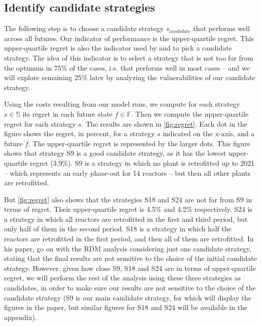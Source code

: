 \subsection{Identify candidate strategies}

The following step is to choose a candidate strategy $s_{candidate}$ that performs well across all futures. Our indicator of performance is the upper-quartile regret. This upper-quartile regret is also the indicator used by \citet{Lempert2006} and \citet{Nahmmacher2016} to pick a candidate strategy. The idea of this indicator is to select a strategy that is not too far from the optimum in 75\% of the cases, i.e. that performs well in most cases -- and we will explore remaining 25\% later by analyzing the vulnerabilities of our candidate strategy. 

Using the costs resulting from our model runs, we compute for each strategy $s \in \mathbb{S}$ its regret in each future state $f \in \mathbb{F}$. Then we compute the upper-quartile regret for each strategy $s$. The results are shown in \cref{fig:regret}. Each dot in the figure shows the regret, in percent, for a strategy $s$ indicated on the x-axis, and a future $f$. The upper-quartile regret is represented by the larger dots. This figure shows that strategy S9 is a good candidate strategy, as it has the lowest upper-quartile regret (3.9\%). S9 is a strategy in which no plant is retrofitted up to 2021 -- which represents an early phase-out for 14 reactors -- but then all other plants are retrofitted.

But \cref{fig:regret} also shows that the strategies S18 and S24 are not far from S9 in terms of regret. Their upper-quartile regret is 4.5\% and 4.2\% respectively. 
S24 is a strategy in which all reactors are retrofitted in the first and third period, but only half of them in the second period. S18 is a strategy in which half the reactors are retrofitted in the first period, and then all of them are retrofitted.
In his paper, \citet{Lempert2006} go on with the RDM analysis considering just one candidate strategy, stating that the final results are not sensitive to the choice of the initial candidate strategy. However, given how close S9, S18 and S24 are in terms of upper-quartile regret, we will perform the rest of the analysis using these three strategies as candidates, in order to make sure our results are not sensitive to the choice of the candidate strategy (S9 is our main candidate strategy, for which will display the figures in the paper, but similar figures for S18 and S24 will be available in the appendix).

